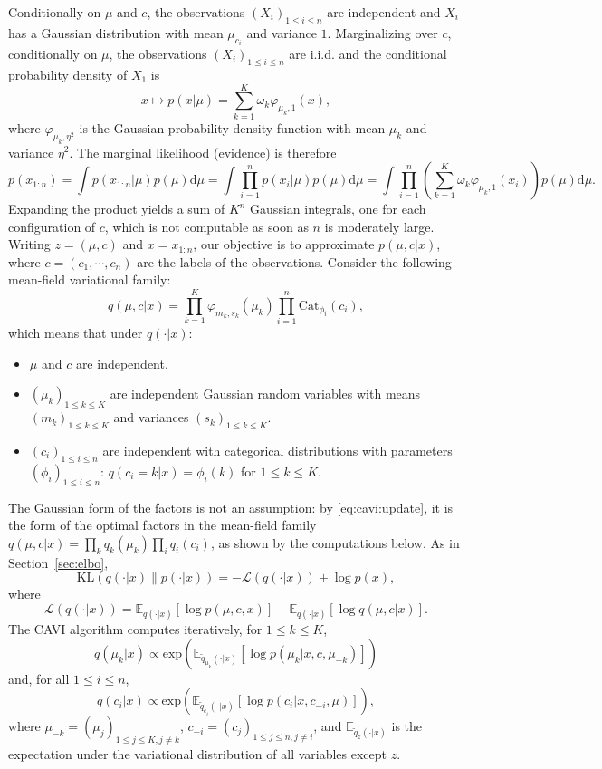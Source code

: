 \documentclass[english,graybox,envcountchap,envcountsame,sectrefs,shortlabels]{svmono}
\theoremstyle{style}
\newcommand{\eqsp}{}
\begin{document}
Conditionally on $\mu$ and $c$, the observations $(X_i)_{1\leqslant i\leqslant n}$ are independent and $X_i$ has a Gaussian distribution with mean $\mu_{c_i}$ and variance $1$. Marginalizing over $c$, conditionally on $\mu$, the observations $(X_i)_{1\leqslant i\leqslant n}$ are i.i.d. and the conditional probability density of $X_1$ is
$$
x\mapsto p(x|\mu) = \sum_{k=1}^K \omega_k \varphi_{\mu_k,1}(x)\eqsp,
$$
where $\varphi_{\mu_k,\eta^2}$ is the Gaussian probability density function with mean $\mu_k$ and variance $\eta^2$. The marginal likelihood (evidence) is therefore
$$
p(x_{1:n}) = \int p(x_{1:n}|\mu) p(\mu) \mathrm{d} \mu = \int \prod_{i=1}^n p(x_i|\mu) p(\mu) \mathrm{d} \mu = \int \prod_{i=1}^n \left(\sum_{k=1}^K \omega_k \varphi_{\mu_k,1}(x_i)\right) p(\mu) \mathrm{d} \mu\eqsp.
$$
Expanding the product yields a sum of $K^n$ Gaussian integrals, one for each configuration of $c$, which is not computable as soon as $n$ is moderately large. Writing $z = (\mu,c)$ and $x = x_{1:n}$, our objective is to approximate $p(\mu,c|x)$, where $c = (c_1,\cdots,c_n)$ are the labels of the observations. Consider the following mean-field variational family:
$$
q(\mu,c|x) = \prod_{k=1}^K \varphi_{m_k,s_k}(\mu_k)\prod_{i=1}^n \mathrm{Cat}_{\phi_i}(c_i)\eqsp,
$$
which means that under $q(\cdot|x)$:
\begin{itemize}
\item $\mu$ and $c$ are independent.
\item $(\mu_{k})_{1\leqslant k \leqslant K}$ are independent Gaussian random variables with means $(m_{k})_{1\leqslant k \leqslant K}$ and variances $(s_{k})_{1\leqslant k \leqslant K}$.
\item $(c_{i})_{1\leqslant i \leqslant n}$ are independent with categorical distributions with parameters $(\phi_i)_{1\leqslant i \leqslant n}$: $q(c_i=k|x) = \phi_i(k)$ for $1\leqslant k \leqslant K$.
\end{itemize}
The Gaussian form of the factors is not an assumption: by \eqref{eq:cavi:update}, it is the form of the optimal factors in the mean-field family $q(\mu,c|x) = \prod_k q_k(\mu_k)\prod_i q_i(c_i)$, as shown by the computations below. As in Section~\ref{sec:elbo},
$$
\mathrm{KL}\left(q(\cdot|x)\|p(\cdot|x)\right) = -\mathcal{L}(q(\cdot|x))+\log p(x)\eqsp,
$$
where
$$
\mathcal{L}(q(\cdot|x))= \mathbb{E}_{q(\cdot|x)}[\log p(\mu,c,x)] - \mathbb{E}_{q(\cdot|x)}[\log q(\mu,c|x)] \eqsp.
$$
The CAVI algorithm computes iteratively, for $1\leqslant k \leqslant K$,
$$
q(\mu_k|x) \propto \mathrm{exp}\left(\mathbb{E}_{\tilde q_{\mu_k}(\cdot|x)}[\log p(\mu_k|x,c,\mu_{-k})]\right)
$$
and, for all $1\leqslant i \leqslant n$,
$$
q(c_i|x) \propto \mathrm{exp}\left(\mathbb{E}_{\tilde q_{c_i}(\cdot|x)}[\log p(c_i|x,c_{-i},\mu)]\right)\eqsp,
$$
where $\mu_{-k} = (\mu_j)_{1\leq j \leq K, j\neq k}$, $c_{-i} = (c_j)_{1\leq j \leq n, j\neq i}$, and $\mathbb{E}_{\tilde q_z(\cdot|x)}$ is the expectation under the variational distribution of all variables except $z$.
\end{document}
